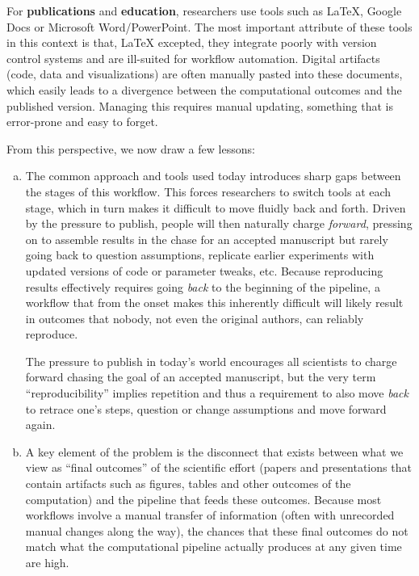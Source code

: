 \documentclass[ChapterTOCs,krantz2]{krantz} %
\begin{document}
For \textbf{publications} and \textbf{education}, researchers use tools such as
\LaTeX, Google Docs or Microsoft Word/PowerPoint.  The most important attribute
of these tools in this context is that, \LaTeX{} excepted, they integrate
poorly with version control systems and are ill-suited for workflow automation.
Digital artifacts (code, data and visualizations) are often manually pasted
into these documents, which easily leads to a divergence between the
computational outcomes and the published version.  Managing this requires
manual updating, something that is error-prone and easy to forget.

From this perspective, we now draw a few lessons:

\begin{enumerate}[(a)]

\item The common approach and tools used today introduces sharp gaps between
  the stages of this workflow.  This forces researchers to switch tools at each
  stage, which in turn makes it difficult to move fluidly back and forth.
  Driven by the pressure to publish, people will then naturally charge
  \emph{forward}, pressing on to assemble results in the chase for an accepted
  manuscript but rarely going back to question assumptions, replicate earlier
  experiments with updated versions of code or parameter tweaks, etc.  Because
  reproducing results effectively requires going \emph{back} to the
  beginning of the pipeline, a workflow that from the onset makes this
  inherently difficult will likely result in outcomes that nobody, not even the
  original authors, can reliably reproduce.

  The pressure to publish in today's world encourages all scientists to charge
  forward chasing the goal of an accepted manuscript, but the very term
  ``reproducibility'' implies repetition and thus a requirement to also move
  \emph{back} to retrace one's steps, question or change assumptions and move
  forward again.

\item A key element of the problem is the disconnect that exists between what
  we view as ``final outcomes'' of the scientific effort (papers and
  presentations that contain artifacts such as figures, tables and other
  outcomes of the computation) and the pipeline that feeds these outcomes.
  Because most workflows involve a manual transfer of information (often with
  unrecorded manual changes along the way), the chances that these final
  outcomes do not match what the computational pipeline actually produces at any
  given time are high.


\end{enumerate}
\end{document}
